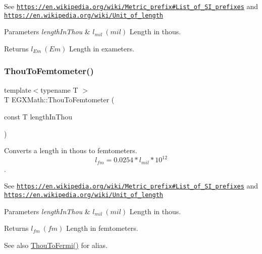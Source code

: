 See \href{https://en.wikipedia.org/wiki/Metric_prefix#List_of_SI_prefixes}{\tt https\+://en.\+wikipedia.\+org/wiki/\+Metric\+\_\+prefix\#\+List\+\_\+of\+\_\+\+S\+I\+\_\+prefixes} and \href{https://en.wikipedia.org/wiki/Unit_of_length}{\tt https\+://en.\+wikipedia.\+org/wiki/\+Unit\+\_\+of\+\_\+length} 
\begin{DoxyParams}{Parameters}
{\em length\+In\+Thou} & $ l_{mil}\ (mil)$ Length in thous. \\
\hline
\end{DoxyParams}
\begin{DoxyReturn}{Returns}
$ l_{Em}\ (Em)$ Length in exameters. 
\end{DoxyReturn}
\mbox{\label{group___e_g_x_math-_conversions-_length_conversions-_imperial-_thou-_s_i_gaecb2f2011c7b1c81a6b94cf3111cc107}} 
\subsubsection{\texorpdfstring{Thou\+To\+Femtometer()}{ThouToFemtometer()}}
{\footnotesize\ttfamily template$<$typename T $>$ \\
T E\+G\+X\+Math\+::\+Thou\+To\+Femtometer (\begin{DoxyParamCaption}\item[{const T}]{length\+In\+Thou }\end{DoxyParamCaption})}



Converts a length in thous to femtometers. \[ l_{fm}=0.0254 * l_{mil} * 10^{12} \]. 

See \href{https://en.wikipedia.org/wiki/Metric_prefix#List_of_SI_prefixes}{\tt https\+://en.\+wikipedia.\+org/wiki/\+Metric\+\_\+prefix\#\+List\+\_\+of\+\_\+\+S\+I\+\_\+prefixes} and \href{https://en.wikipedia.org/wiki/Unit_of_length}{\tt https\+://en.\+wikipedia.\+org/wiki/\+Unit\+\_\+of\+\_\+length} 
\begin{DoxyParams}{Parameters}
{\em length\+In\+Thou} & $ l_{mil}\ (mil)$ Length in thous. \\
\hline
\end{DoxyParams}
\begin{DoxyReturn}{Returns}
$ l_{fm}\ (fm)$ Length in femtometers. 
\end{DoxyReturn}
\begin{DoxySeeAlso}{See also}
\mbox{\hyperlink{group___e_g_x_math-_conversions-_length_conversions-_imperial-_thou-_non-_s_i_ga4a134cf9b956cd51e579dc65b4fd7774}{Thou\+To\+Fermi()}} for alias. 
\end{DoxySeeAlso}
\mbox{\label{group___e_g_x_math-_conversions-_length_conversions-_imperial-_thou-_s_i_ga53354dce1cb2e9b136520fa3cf836305}} 
